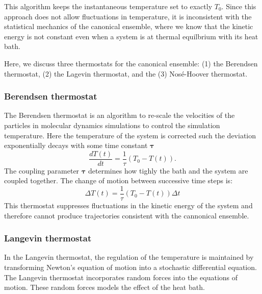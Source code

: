 This algorithm keeps the instantaneous temperature set to exactly $T_0$.  Since this approach does not allow fluctuations in temperature, it is inconsistent with the statistical mechanics of the canonical ensemble, where we know that the kinetic energy is not constant even when a system is at thermal equilbrium with its heat bath.

Here, we discuss three thermostats for the canonical ensemble: (1) the Berendsen thermostat, (2) the Lagevin thermostat, and the (3) Nos\'e-Hoover thermostat.

\subsubsection{Berendsen thermostat}

The Berendsen thermostat\cite{berendsen1984_nvt} is an algorithm to re-scale the velocities of the particles in molecular dynamics simulations to control the simulation temperature.  Here the temperature of the system is corrected such the deviation exponentially decays with some time constant $\bm{\tau}$
\begin{equation}
  \label{eq:npt_berendsen_1}
  \frac{dT(t)}{dt} = \frac{1}{\tau} (T_0 - T(t)).
\end{equation}
The coupling parameter $\bm{\tau}$ determines how tighly the bath and the system are coupled together.  The change of motion between successive time steps is:
\begin{equation}
  \label{eq:npt_berendsen_2}
  \Delta T(t) = \frac{1}{\tau} (T_0 - T(t)) \Delta t
\end{equation}
This thermostat suppresses fluctuations in the kinetic energy of the system and therefore cannot produce trajectories consistent with the cannonical ensemble.

\subsubsection{Langevin thermostat}

In the Langevin thermostat\cite{allen1987_md}, the regulation of the temperature is maintained by transforming Newton's equation of motion into a stochastic differential equation.
The Langevin thermostat incorporates random forces into the equations of motion.  These random forces models the effect of the heat bath.

